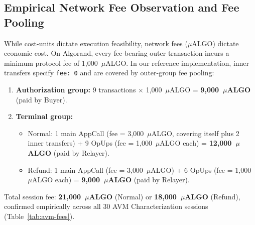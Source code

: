 \subsection{Empirical Network Fee Observation and Fee Pooling}
While cost-units dictate execution feasibility, network fees ($\mu$ALGO) dictate economic cost. On Algorand, every fee-bearing outer transaction incurs a minimum protocol fee of 1{,}000~$\mu$ALGO. In our reference implementation, inner transfers specify \texttt{fee: 0} and are covered by outer-group fee pooling:
\begin{enumerate}[leftmargin=*]
\item \textbf{Authorization group:} 9 transactions $\times$ 1{,}000~$\mu$ALGO = \textbf{9{,}000~$\mu$ALGO} (paid by Buyer).
\item \textbf{Terminal group:} 
\begin{itemize}
\item Normal: 1 main AppCall (fee = 3{,}000~$\mu$ALGO, covering itself plus 2 inner transfers) + 9 OpUps (fee = 1{,}000~$\mu$ALGO each) = \textbf{12{,}000~$\mu$ALGO} (paid by Relayer).
\item Refund: 1 main AppCall (fee = 3{,}000~$\mu$ALGO) + 6 OpUps (fee = 1{,}000~$\mu$ALGO each) = \textbf{9{,}000~$\mu$ALGO} (paid by Relayer).
\end{itemize}
\end{enumerate}

\noindent Total session fee: \textbf{21{,}000~$\mu$ALGO} (Normal) or \textbf{18{,}000~$\mu$ALGO} (Refund), confirmed empirically across all 30 AVM Characterization sessions (Table~\ref{tab:avm-fees}).

\begin{table}[h]
\centering
\caption{Empirical fee breakdown by session type}
\label{tab:avm-fees}
\end{table}

